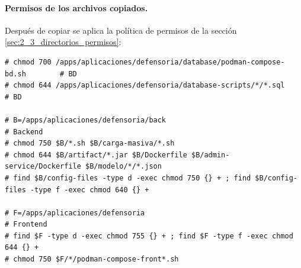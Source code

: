 \paragraph{Permisos de los archivos copiados.} Después de copiar se aplica la política de permisos de la sección \ref{sec:2_3_directorios_permisos}:
\begin{lstlisting}
# chmod 700 /apps/aplicaciones/defensoria/database/podman-compose-bd.sh        # BD
# chmod 644 /apps/aplicaciones/defensoria/database-scripts/*/*.sql             # BD

# B=/apps/aplicaciones/defensoria/back                                         # Backend
# chmod 750 $B/*.sh $B/carga-masiva/*.sh
# chmod 644 $B/artifact/*.jar $B/Dockerfile $B/admin-service/Dockerfile $B/modelo/*/*.json
# find $B/config-files -type d -exec chmod 750 {} + ; find $B/config-files -type f -exec chmod 640 {} +

# F=/apps/aplicaciones/defensoria                                              # Frontend
# find $F -type d -exec chmod 755 {} + ; find $F -type f -exec chmod 644 {} +
# chmod 750 $F/*/podman-compose-front*.sh
\end{lstlisting}
